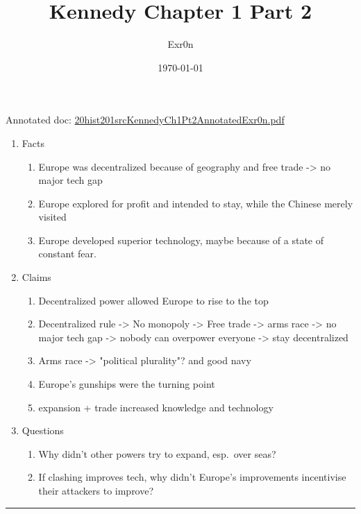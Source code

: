 \documentclass[letterpaper]{article}
\author{Exr0n}
\date{\today}
\title{Kennedy Chapter 1 Part 2}
\renewcommand{\tableofcontents}{}
\begin{document}
\tableofcontents

Annotated doc:
\href{20hist201srcKennedyCh1Pt2AnnotatedExr0n.pdf.org}{20hist201srcKennedyCh1Pt2AnnotatedExr0n.pdf}

\begin{enumerate}
\item Facts

\begin{enumerate}
\item Europe was decentralized because of geography and free trade -> no
major tech gap
\item Europe explored for profit and intended to stay, while the Chinese
merely visited
\item Europe developed superior technology, maybe because of a state of
constant fear.
\end{enumerate}

\item Claims

\begin{enumerate}
\item Decentralized power allowed Europe to rise to the top
\item Decentralized rule -> No monopoly -> Free trade -> arms race -> no
major tech gap -> nobody can overpower everyone -> stay
decentralized
\item Arms race -> "political plurality"? and good navy
\item Europe's gunships were the turning point
\item expansion + trade increased knowledge and technology
\end{enumerate}

\item Questions

\begin{enumerate}
\item Why didn't other powers try to expand, esp. over seas?
\item If clashing improves tech, why didn't Europe's improvements
incentivise their attackers to improve?
\end{enumerate}
\end{enumerate}

\noindent\rule{\textwidth}{0.5pt}
\end{document}
